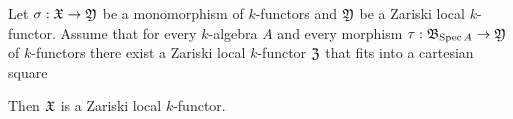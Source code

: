 \begin{proposition}\label{proposition:representablemonomorphismsaresheaves}
Let $\sigma:{\mathfrak X} \rightarrow {\mathfrak Y}$ be a monomorphism of $k$-functors and ${\mathfrak Y}$ be a Zariski local $k$-functor. Assume that for every $k$-algebra $A$ and every morphism $\tau:{\mathfrak B}_{\mathrm{Spec}\, A}\rightarrow {\mathfrak Y}$ of $k$-functors there exist a Zariski local $k$-functor ${\mathfrak Z}$ that fits into a cartesian square
\begin{center}
\end{center}
Then ${\mathfrak X}$ is a Zariski local $k$-functor.
\end{proposition}
